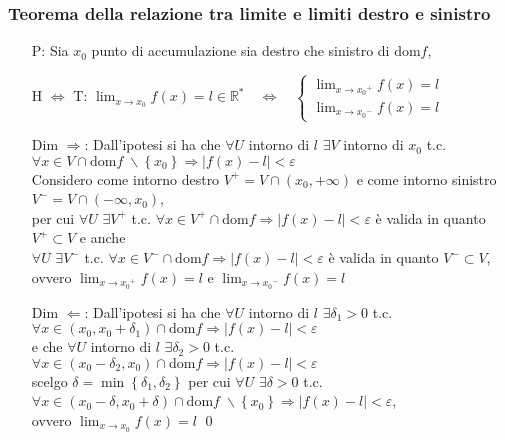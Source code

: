 \documentclass[a4paper]{article}
\newcommand\dom{\text{dom}}
\begin{document}
\subsubsection*{Teorema della relazione tra limite e limiti destro e sinistro}
\begin{itemize}
	\item[P:] Sia \(x_0\) punto di accumulazione sia destro che sinistro di \(\dom f\),
	\item[H \(\Leftrightarrow\) T:] \(\displaystyle \lim_{x \to x_0} f(x) = l \in \mathbb{R}^* \quad \Leftrightarrow \quad
	\begin{cases}
		\displaystyle \lim_{x \to {x_0}^+} f(x) = l \\
		\displaystyle \lim_{x \to {x_0}^-} f(x) = l
	\end{cases}
	\)

	\item[Dim \(\Rightarrow\):] Dall'ipotesi si ha che \(\forall U\) intorno di \(l\) \(\exists V\) intorno di \(x_0\) t.c. \(\forall x \in V \cap \dom f \; \backslash \left\{ x_0 \right\} \Rightarrow \left| f(x) - l \right| < \varepsilon\) \\
	Considero come intorno destro \(V^+ = V \cap \left( x_0, + \infty \right) \) e come intorno sinistro \(V^- = V \cap \left( -\infty, x_0 \right)\), \\
	per cui \(\forall U\) \(\exists V^+\) t.c. \(\forall x \in V^+ \cap \dom f \Rightarrow \left| f(x) - l \right| < \varepsilon\) è valida in quanto \(V^+ \subset V\) e anche \\
	\(\forall U\) \(\exists V^-\) t.c. \(\forall x \in V^- \cap \dom f \Rightarrow \left| f(x) - l \right| < \varepsilon\) è valida in quanto \(V^- \subset V\), \\
	ovvero \(\displaystyle \lim_{x \to {x_0}^+} f(x) = l\) e \(\displaystyle \lim_{x \to {x_0}^-} f(x) = l\)
	
	\item[Dim \(\Leftarrow\):] Dall'ipotesi si ha che \(\forall U\) intorno di \(l\) \(\exists \delta_1 > 0\) t.c. \(\forall x \in \left( x_0, x_0 + \delta_1 \right) \cap \dom f \Rightarrow \left| f(x) - l \right| < \varepsilon\) \\
	e che \(\forall U\) intorno di \(l\) \(\exists \delta_2 > 0\) t.c. \(\forall x \in \left( x_0 - \delta_2, x_0 \right) \cap \dom f \Rightarrow \left| f(x) - l \right| < \varepsilon\) \\
	scelgo \(\delta = \min \left\{ \delta_1, \delta_2 \right\}\) per cui \(\forall U\) \(\exists \delta > 0\) t.c. \(\forall x \in \left( x_0 - \delta, x_0 + \delta \right) \cap \dom f \; \backslash \left\{ x_0 \right\} \Rightarrow \left| f(x) - l \right| < \varepsilon\), \\
	ovvero \(\displaystyle \lim_{x \to x_0} f(x) = l\) \qed
\end{itemize}
\end{document}

